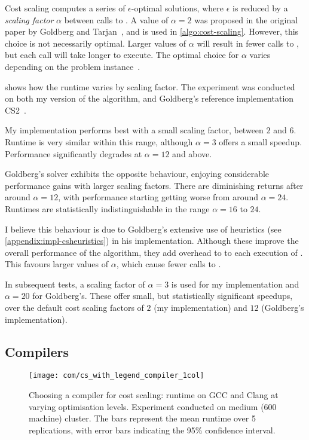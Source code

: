 Cost scaling computes a series of $\epsilon$-optimal solutions, where $\epsilon$ is reduced by a \emph{scaling factor} $\alpha$ between calls to . A value of $\alpha=2$ was proposed in the original paper by Goldberg and Tarjan~\cite{Goldberg:1987}, and is used in \cref{algo:cost-scaling}. However, this choice is not necessarily optimal. Larger values of $\alpha$ will result in fewer calls to , but each call will take longer to execute. The optimal choice for $\alpha$ varies depending on the problem instance~\cite[\S7]{Goldberg:1997}.

 shows how the runtime varies by scaling factor. %
The experiment was conducted on both my version of the algorithm, and Goldberg's reference implementation CS2~\cite{CS2:2009}.

My implementation performs best with a small scaling factor, between $2$ and $6$. Runtime is very similar within this range, although $\alpha=3$ offers a small speedup. Performance significantly degrades at $\alpha = 12$ and above.

Goldberg's solver exhibits the opposite behaviour, enjoying considerable performance gains with larger scaling factors. There are diminishing returns after around $\alpha = 12$, with performance starting getting worse from around $\alpha = 24$. Runtimes are statistically indistinguishable in the range $\alpha=16$ to $24$.

I believe this behaviour is due to Goldberg's extensive use of heuristics (see \cref{appendix:impl-csheuristics}) in his implementation. Although these improve the overall performance of the algorithm, they add overhead to to each execution of . This favours larger values of $\alpha$, which cause fewer calls to . 

In subsequent tests, a scaling factor of $\alpha = 3$ is used for my implementation and $\alpha = 20$ for Goldberg's. These offer small, but statistically significant speedups, over the default cost scaling factors of $2$ (my implementation) and $12$ (Goldberg's implementation).

\subsection{Compilers} \label{sec:eval-optimisations-compilers}

\begin{figure}
    \texttt{[image: com/cs\_with\_legend\_compiler\_1col]}
    \caption[Choosing a compiler for cost scaling]{Choosing a compiler for cost scaling: runtime on GCC and Clang at varying optimisation levels. Experiment conducted on medium (600 machine) cluster. The bars represent the mean runtime over 5 replications, with error bars indicating the 95\% confidence interval.}
    \label{fig:compiler-settings}
\end{figure}

